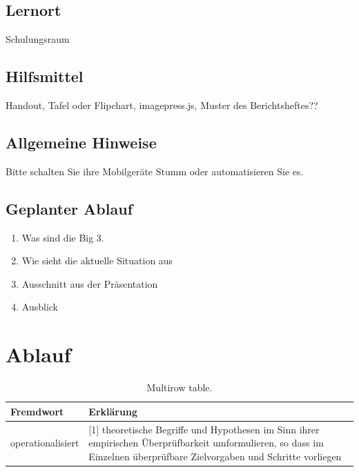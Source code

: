 \documentclass{article}
\begin{document}
   \subsection{Lernort}
   Schulungsraum
   
   \subsection{Hilfsmittel}
   Handout, Tafel oder Flipchart, imagepress.js, Muster des Berichtsheftes??
   
	\subsection{Allgemeine Hinweise}
	Bitte schalten Sie ihre Mobilgeräte Stumm oder automatisieren Sie es.
	
	\subsection{Geplanter Ablauf}
	\begin{enumerate}
		\item Was sind die Big 3. %
		\item Wie sieht die aktuelle Situation aus
		\item Ausschnitt aus der Präsentation %
		\item Ausblick
	\end{enumerate}
\newpage
\section{Ablauf}
\begin{table}[h!]
	\begin{center}
		\caption{Multirow table.}
		\label{tab:table1}
		\begin{tabular}{|l|p{10cm}|}
			\textbf{Fremdwort} & \textbf{Erklärung}\\
			\hline
			operationalisiert &[1] theoretische Begriffe und Hypothesen im Sinn ihrer empirischen Überprüfbarkeit umformulieren, so dass im Einzelnen überprüfbare Zielvorgaben und Schritte vorliegen\\
		\end{tabular}
	\end{center}
\end{table}

        
\newpage        
\end{document}
